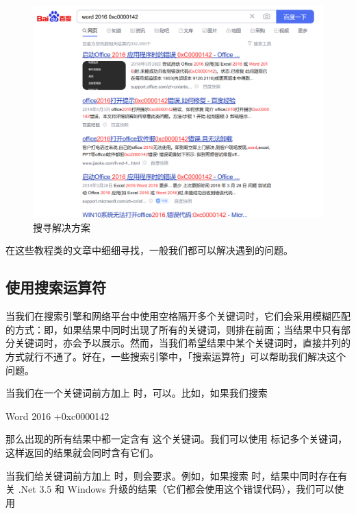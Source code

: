 \begin{figure}[htb!]
  \centering
  \includegraphics[width=.9\textwidth]{assets/basic/Searching_for_err_code.png}
  \caption{搜寻解决方案}
  \label{fig:Searching_for_err_code}
\end{figure}

在这些教程类的文章中细细寻找，一般我们都可以解决遇到的问题。

\subsection{使用搜索运算符}

当我们在搜索引擎和网络平台中使用空格隔开多个关键词时，它们会采用模糊匹配的方式：即，如果结果中同时出现了所有的关键词，则排在前面；当结果中只有部分关键词时，亦会予以展示。然而，当我们希望结果中某个关键词时，直接并列的方式就行不通了。好在，一些搜索引擎中，「搜索运算符」可以帮助我们解决这个问题。

当我们在一个关键词前方加上 \MissingVerb{+} 时，可以。比如，如果我们搜索

\begin{quoting}
  Word 2016 +0xc0000142
\end{quoting}

那么出现的所有结果中都一定含有  这个关键词。我们可以使用 \MissingVerb{+} 标记多个关键词，这样返回的结果就会同时含有它们。

当我们给关键词前方加上 \MissingVerb{-} 时，则会要求。例如，如果搜索  时，结果中同时存在有关 .Net 3.5 和 Windows 升级的结果（它们都会使用这个错误代码），我们可以使用

